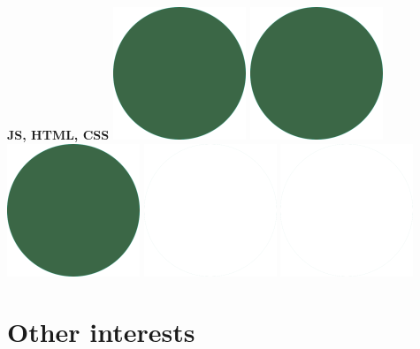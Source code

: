\documentclass[]{commands}
\begin{document}
\begin{aside}
\textbf{JS, HTML, CSS}\hfill
\includegraphics[scale=0.11]{img/IPSGreenDots.png}
\includegraphics[scale=0.11]{img/IPSGreenDots.png}
\includegraphics[scale=0.11]{img/IPSGreenDots.png}
\includegraphics[scale=0.11]{img/WhiteDots.png}
\includegraphics[scale=0.11]{img/WhiteDots.png}

\vspace{3.5mm}
\section{Other interests}
\vspace{3.5mm}


\end{aside}
\end{document}
